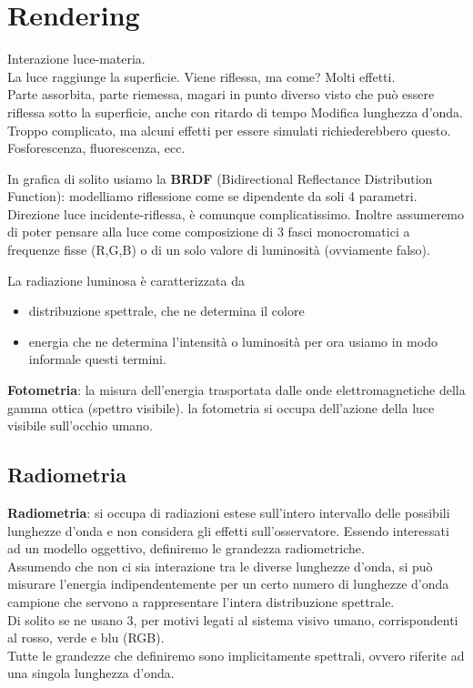 \documentclass[a4paper, 10pt]{article}
\begin{document}
	
	\section{Rendering}
		Interazione luce-materia.\\
		La luce raggiunge la superficie. Viene riflessa, ma come? Molti
		effetti.\\
		Parte assorbita, parte riemessa, magari in punto diverso visto che
		può essere riflessa sotto la superficie, anche con ritardo di tempo
		Modifica lunghezza d'onda.\\
		Troppo complicato, ma alcuni effetti per essere simulati
		richiederebbero questo. Fosforescenza, fluorescenza, ecc.
		
		\bigskip
		
		\noindent
		In grafica di solito usiamo la \textbf{BRDF} (Bidirectional Reflectance Distribution Function): modelliamo riflessione	come se dipendente da soli 4 parametri.
		Direzione luce incidente-riflessa, è comunque complicatissimo.
		Inoltre assumeremo di poter pensare alla luce come composizione di
		3 fasci monocromatici a frequenze fisse (R,G,B) o di un solo valore di
		luminosità (ovviamente falso).
		
		\noindent
		La radiazione luminosa è caratterizzata da
		\begin{itemize}
			\item distribuzione spettrale, che ne determina il colore
			\item energia che ne determina l'intensità o luminosità
			per ora usiamo in modo informale questi termini.
		\end{itemize}
		\textbf{Fotometria}: la misura dell’energia trasportata dalle
		onde elettromagnetiche della gamma ottica (spettro visibile).
		la fotometria si occupa dell’azione della luce visibile sull’occhio
		umano.\\
		
		\subsection{Radiometria}
		
		\textbf{Radiometria}: si occupa di radiazioni estese sull’intero
		intervallo delle possibili lunghezze d’onda e non considera gli
		effetti sull’osservatore.
		Essendo interessati ad un modello oggettivo, definiremo le
		grandezza radiometriche.\\
		Assumendo che non ci sia interazione tra le diverse lunghezze
		d’onda, si può misurare l’energia indipendentemente per un
		certo numero di lunghezze d’onda campione che servono a
		rappresentare l’intera distribuzione spettrale.\\
		Di solito se ne usano 3, per motivi legati al sistema visivo
		umano, corrispondenti al rosso, verde e blu (RGB).\\
		Tutte le grandezze che definiremo sono implicitamente
		spettrali, ovvero riferite ad una singola lunghezza d’onda.
		
\end{document}
